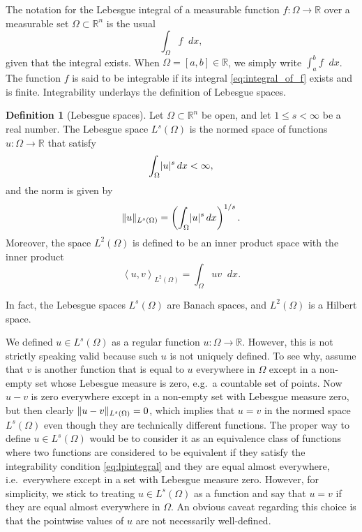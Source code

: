 \documentclass[english, 12pt, a4paper, sci, utf8, a-2b, online]{aaltothesis}
\theoremstyle{definition}
\newtheorem{definition}{Definition}[section]
\theoremstyle{plain}
\DeclarePairedDelimiter\abs{\lvert}{\rvert}
\DeclarePairedDelimiter\norm{\lVert}{\rVert}
\newcommand*{\innerprod}[2]{\left\langle #1, #2 \right\rangle}
\newcommand*\diff{\mathop{}\!d}
\numberwithin{equation}{section}
\begin{document}
The notation for the Lebesgue integral of a measurable function
$f: \Omega \to \mathbb{R}$ over a measurable set $\Omega \subset \mathbb{R}^n$
is the usual
\begin{equation}
    \label{eq:integral_of_f}
    \int_{\Omega} f \diff x,
\end{equation}
given that the integral exists. When $\Omega = [a,b] \in \mathbb{R}$,
we simply write $\int_{a}^{b} f \diff x$.
The function $f$ is said to be integrable if its integral \eqref{eq:integral_of_f}
exists and is finite.
Integrability underlays the definition of Lebesgue spaces.
\begin{definition}[Lebesgue spaces]
    \label{def:lebesguespaces}
    Let $\Omega \subset \mathbb{R}^n$ be open,
    and let $1 \leq s < \infty$ be a real number.
    The Lebesgue space $L^s(\Omega)$ is the normed space of functions
    $u: \Omega \to \mathbb{R}$ that satisfy
    \begin{equation}
        \label{eq:lpintegral}
        \int_{\Omega} \abs{u}^s \diff x < \infty,
    \end{equation}
    and the norm is given by
    \begin{equation*}
        \norm{u}_{L^s(\Omega)}
        = \left( \int_{\Omega} \abs{u}^s \diff x \right)^{1/s}.
    \end{equation*}
    Moreover, the space $L^2(\Omega)$ is defined to be an inner product space
    with the inner product
    \begin{equation*}
        \innerprod{u}{v}_{L^2(\Omega)} = \int_{\Omega} uv \diff x.
    \end{equation*}
\end{definition}
In fact, the Lebesgue spaces $L^s(\Omega)$ are Banach spaces,
and $L^2(\Omega)$ is a Hilbert space.

We defined $u \in L^s(\Omega)$ as a regular function $u: \Omega \to \mathbb{R}$.
However, this is not strictly speaking valid because such $u$ is not uniquely defined.
To see why, assume that $v$ is another function that is equal to $u$ everywhere
in $\Omega$ except in a non-empty set whose Lebesgue measure is zero,
e.g.\ a countable set of points.
Now $u-v$ is zero everywhere except in a non-empty set with Lebesgue measure zero,
but then clearly $\norm{u-v}_{L^s(\Omega)} = 0$, which implies that $u=v$
in the normed space $L^s(\Omega)$ even though they are technically different functions.
The proper way to define $u \in L^s(\Omega)$ would be to consider it as
an equivalence class of functions where two functions are considered to be
equivalent if they satisfy the integrability condition \eqref{eq:lpintegral}
and they are equal almost everywhere, i.e.\ everywhere except in a set
with Lebesgue measure zero. However, for simplicity, we stick to treating
$u \in L^s(\Omega)$ as a function and say that $u=v$ if they are equal almost 
everywhere in $\Omega$. An obvious caveat regarding this choice is that
the pointwise values of $u$ are not necessarily well-defined.
\end{document}
